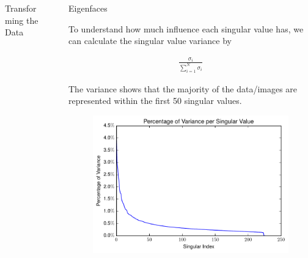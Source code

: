 \documentclass[final]{beamer}
\newlength{\sepwid}
\newlength{\onecolwid}
\begin{document}
\begin{frame}[t]
\begin{columns}[t]
\begin{column}{\onecolwid}
\begin{block}{Transforming the Data}
\end{block}


\end{column} %

\begin{column}{\sepwid}\end{column} %

\begin{column}{\onecolwid} %


\begin{block}{Eigenfaces}

To understand how much influence each singular value has, we can calculate the singular value variance by

\begin{align*}
  \frac{\sigma_{i}}{\sum_{i=1}^{N}\sigma_{i}}
\end{align*}

The variance shows that the majority of the data/images are represented within the first 50 singular values.

\begin{figure}
\centering
  \centering
  \includegraphics[width=.85\linewidth]{../data/Singularvalue_Variance.pdf}
  \label{fig:eig_acc}
\end{figure}


\end{block}
\end{column}
\end{columns}
\end{frame}
\end{document}
